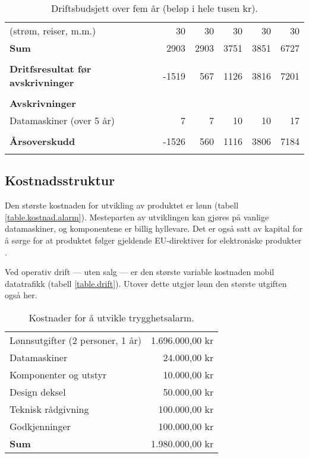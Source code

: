 \begin{table}
\begin{tabular}{lrrrrr}
    (strøm, reiser, m.m.)           &    30 &   30 &   30 &    30 &    30 \\
    \textbf{Sum}                    &  2903 & 2903 & 3751 &  3851 &  6727 \\
    \\
    \textbf{Dritfsresultat før avskrivninger}
                                    & -1519 &  567 & 1126 &  3816 &  7201 \\
    \hline
    \\
    \textbf{Avskrivninger} \\
    Datamaskiner (over 5 år)        &     7 &    7 &   10 &    10 &    17 \\
    \\
    \textbf{Årsoverskudd}           & -1526 &  560 & 1116 &  3806 &  7184 \\
    \thickhline
    \\
  \end{tabular}
  \caption{Driftsbudsjett over fem år (beløp i hele tusen kr).}
  \label{table.driftsbudsjett}
\end{table}

\subsection{Kostnadsstruktur}


Den største kostnaden for utvikling av produktet er lønn (tabell
\vref{table.kostnad.alarm}). Mesteparten av utviklingen kan gjøres på vanlige
datamaskiner, og komponentene er billig hyllevare. Det er også satt av kapital
for å sørge for at produktet følger gjeldende EU-direktiver for elektroniske
produkter \cite{dir.rohs, dir.2001.95}.

Ved operativ drift --- uten salg --- er den største variable kostnaden mobil
datatrafikk (tabell \vref{table.drift}). Utover dette utgjør lønn den største
utgiften også her.

\begin{table}
  \centering
  \begin{tabular}{lr}
    Lønnsutgifter (2 personer, 1 år) &  1.696.000,00 kr \\
    Datamaskiner                     &     24.000,00 kr \\
    Komponenter og utstyr            &     10.000,00 kr \\
    Design deksel                    &     50.000,00 kr \\
    Teknisk rådgivning               &    100.000,00 kr \\
    Godkjenninger                    &    100.000,00 kr \\
    \textbf{Sum}                     &  1.980.000,00 kr \\
  \end{tabular}
  \caption{Kostnader for å utvikle trygghetsalarm.}
  \label{table.kostnad.alarm}
\end{table}

